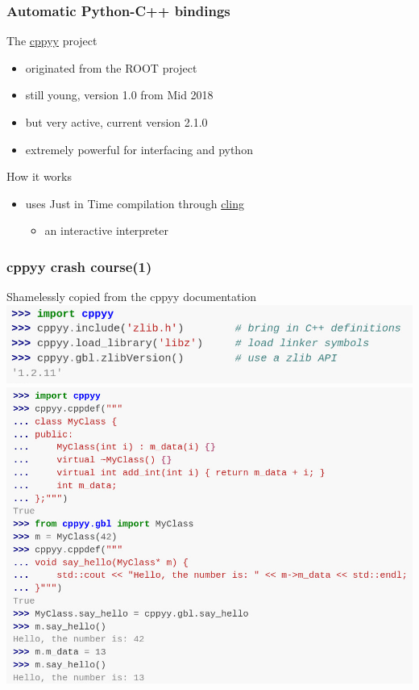 \begin{frame}
  \frametitle{Automatic Python-C++ bindings}
  \begin{block}{The {\color{blue!50!white} \href{https://cppyy.readthedocs.io}{cppyy}} project}
    \begin{itemize}
    \item originated from the ROOT project
    \item still young, version 1.0 from Mid 2018
    \item but very active,  current version 2.1.0
    \item extremely powerful for interfacing \cpp and python
    \end{itemize}
  \end{block}
  \begin{block}{How it works}
    \begin{itemize}
    \item uses Just in Time compilation through {\color{blue!50!black} \href{https://github.com/vgvassilev/cling}{cling}}
      \begin{itemize}
      \item an interactive \cpp interpreter
      \end{itemize}
    \end{itemize}
  \end{block}
\end{frame}

\begin{frame}
  \frametitle{cppyy crash course(1)}
  Shamelessly copied from the cppyy documentation
  \includegraphics[width=.8\textwidth]{python/cppyy2.png}
  \includegraphics[trim={0 3.2cm 0 0},clip,width=\textwidth]{python/cppyy.png}
\end{frame}

